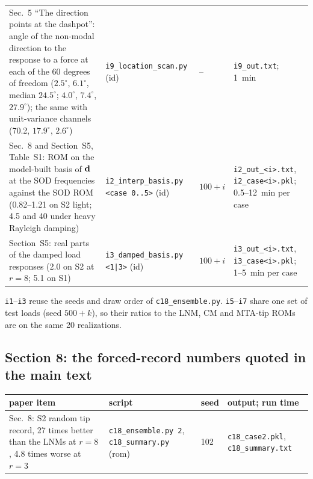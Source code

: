 \documentclass[10pt]{article}
\newcommand{\f}[1]{\texttt{#1}}
\begin{document}
\begin{longtable}{L{0.31\textwidth}L{0.25\textwidth}L{0.08\textwidth}L{0.25\textwidth}}
Sec.~5 ``The direction points at the dashpot'': angle of the non-modal direction to the response to a force at each of the 60 degrees of freedom ($2.5^\circ$, $6.1^\circ$, median $24.5^\circ$; $4.0^\circ$, $7.4^\circ$, $27.9^\circ$); the same with unit-variance channels (70.2, $17.9^\circ$, $2.6^\circ$) & \f{i9\_\allowbreak{}location\_\allowbreak{}scan.py} (id) & -- & \f{i9\_\allowbreak{}out.txt}; 1~min\\
Sec.~8 and Section~S5, Table~S1: ROM on the model-built basis of $\bf d$ at the SOD frequencies against the SOD ROM (0.82--1.21 on S2 light; 4.5 and 40 under heavy Rayleigh damping) & \f{i2\_\allowbreak{}interp\_\allowbreak{}basis.py <case 0..5>} (id) & $100+i$ & \f{i2\_\allowbreak{}out\_\allowbreak{}<i>.txt}, \f{i2\_\allowbreak{}case<i>.pkl}; 0.5--12~min per case\\
Section~S5: real parts of the damped load responses (2.0 on S2 at $r=8$; 5.1 on S1) & \f{i3\_\allowbreak{}damped\_\allowbreak{}basis.py <1|3>} (id) & $100+i$ & \f{i3\_\allowbreak{}out\_\allowbreak{}<i>.txt}, \f{i3\_\allowbreak{}case<i>.pkl}; 1--5~min per case\\
\bottomrule
\end{longtable}
\f{i1}--\f{i3} reuse the seeds and draw order of \f{c18\_\allowbreak{}ensemble.py}. \f{i5}--\f{i7} share one set of test loads (seed $500+k$), so their ratios to the LNM, CM and MTA-tip ROMs are on the same 20 realizations.

\subsection*{Section 8: the forced-record numbers quoted in the main text}
\begin{longtable}{L{0.31\textwidth}L{0.25\textwidth}L{0.08\textwidth}L{0.25\textwidth}}
\toprule
paper item & script & seed & output; run time\\ \midrule
Sec.~8: S2 random tip record, 27 times better than the LNMs at $r=8$, 4.8 times worse at $r=3$ & \f{c18\_\allowbreak{}ensemble.py 2}, \f{c18\_\allowbreak{}summary.py} (rom) & 102 & \f{c18\_\allowbreak{}case2.pkl}, \f{c18\_\allowbreak{}summary.txt}\\
\bottomrule
\end{longtable}
\end{document}

